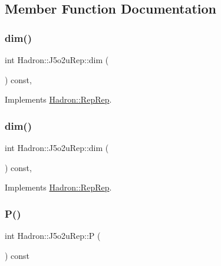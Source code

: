 \subsection{Member Function Documentation}
\mbox{\label{structHadron_1_1J5o2uRep_a7168156bdf8a4353ed627e4be0a16f8b}} 
\subsubsection{\texorpdfstring{dim()}{dim()}\hspace{0.1cm}{\footnotesize\ttfamily [1/2]}}
{\footnotesize\ttfamily int Hadron\+::\+J5o2u\+Rep\+::dim (\begin{DoxyParamCaption}{ }\end{DoxyParamCaption}) const\hspace{0.3cm}{\ttfamily [inline]}, {\ttfamily [virtual]}}



Implements \mbox{\hyperlink{structHadron_1_1RepRep_a92c8802e5ed7afd7da43ccfd5b7cd92b}{Hadron\+::\+Rep\+Rep}}.

\mbox{\label{structHadron_1_1J5o2uRep_a7168156bdf8a4353ed627e4be0a16f8b}} 
\subsubsection{\texorpdfstring{dim()}{dim()}\hspace{0.1cm}{\footnotesize\ttfamily [2/2]}}
{\footnotesize\ttfamily int Hadron\+::\+J5o2u\+Rep\+::dim (\begin{DoxyParamCaption}{ }\end{DoxyParamCaption}) const\hspace{0.3cm}{\ttfamily [inline]}, {\ttfamily [virtual]}}



Implements \mbox{\hyperlink{structHadron_1_1RepRep_a92c8802e5ed7afd7da43ccfd5b7cd92b}{Hadron\+::\+Rep\+Rep}}.

\mbox{\label{structHadron_1_1J5o2uRep_a61de16e8a0a311ebef917a04c3930c4f}} 
\subsubsection{\texorpdfstring{P()}{P()}\hspace{0.1cm}{\footnotesize\ttfamily [1/2]}}
{\footnotesize\ttfamily int Hadron\+::\+J5o2u\+Rep\+::P (\begin{DoxyParamCaption}{ }\end{DoxyParamCaption}) const\hspace{0.3cm}{\ttfamily [inline]}}

